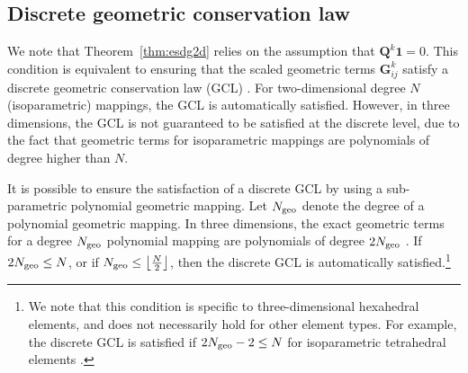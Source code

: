 \documentclass[onefignum,onetabnum,final]{siamart171218}
\begin{document}
\subsection{Discrete geometric conservation law}

We note that Theorem~\ref{thm:esdg2d} relies on the assumption that $\bm{Q}^k\bm{1} = 0$.  This condition is equivalent to ensuring that the scaled geometric terms ${\bm{G}}^k_{ij}$ satisfy a discrete geometric conservation law (GCL) \cite{carpenter2014entropy, gassner2017br1, crean2018entropy, chan2018discretely}.  For two-dimensional degree $N$ (isoparametric) mappings, the GCL is automatically satisfied.  However, in three dimensions, the GCL is not guaranteed to be satisfied at the discrete level, due to the fact that geometric terms for isoparametric mappings are polynomials of degree higher than $N$.  

It is possible to ensure the satisfaction of a discrete GCL by using a sub-parametric polynomial geometric mapping.  Let $N_{\rm geo}$ denote the degree of a polynomial geometric mapping.  In three dimensions, the exact geometric terms for a degree $N_{\rm geo}$ polynomial mapping are polynomials of degree $2N_{\rm geo}$ \cite{kopriva2006metric, hindenlang2012explicit, crean2018entropy}.  If $2N_{\rm geo} \leq N$, or if $N_{\rm geo} \leq \left\lfloor\frac{N}{2}\right\rfloor$, then the discrete GCL is automatically satisfied.\footnote{We note that this condition is specific to three-dimensional hexahedral elements, and does not necessarily hold for other element types.  For example, the discrete GCL is satisfied if $2N_{\rm geo}-2 \leq N$ for isoparametric tetrahedral elements \cite{chan2018discretely}.}
\end{document}
